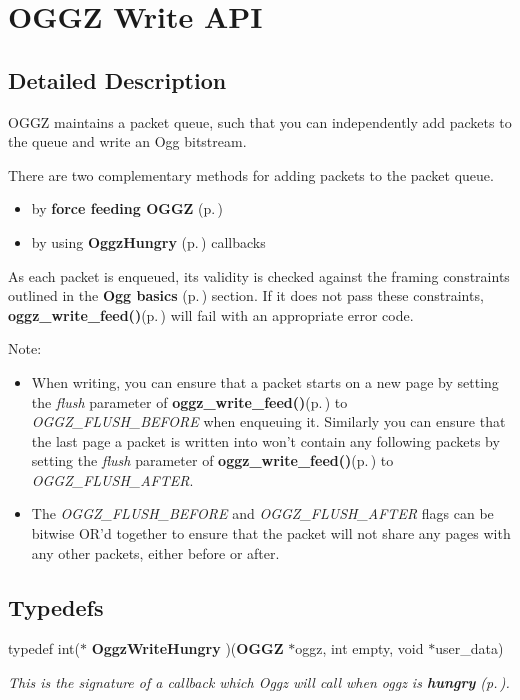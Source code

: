 \section{OGGZ Write API}
\label{group__write__api}


\subsection{Detailed Description}
OGGZ maintains a packet queue, such that you can independently add packets to the queue and write an Ogg bitstream. 

There are two complementary methods for adding packets to the packet queue.

\begin{itemize}
\item by {\bf force feeding OGGZ }{\rm (p.\,\pageref{group__force__feed})}\item by using {\bf Oggz\-Hungry }{\rm (p.\,\pageref{group__hungry})} callbacks\end{itemize}


As each packet is enqueued, its validity is checked against the framing constraints outlined in the {\bf Ogg basics }{\rm (p.\,\pageref{group__basics})} section. If it does not pass these constraints, {\bf oggz\_\-write\_\-feed()}{\rm (p.\,\pageref{group__write__api_ga2})} will fail with an appropriate error code.

\begin{Desc}
\item[Note:]\begin{itemize}
\item When writing, you can ensure that a packet starts on a new page by setting the {\em flush\/} parameter of {\bf oggz\_\-write\_\-feed()}{\rm (p.\,\pageref{group__write__api_ga2})} to {\em OGGZ\_\-FLUSH\_\-BEFORE\/} when enqueuing it. Similarly you can ensure that the last page a packet is written into won't contain any following packets by setting the {\em flush\/} parameter of {\bf oggz\_\-write\_\-feed()}{\rm (p.\,\pageref{group__write__api_ga2})} to {\em OGGZ\_\-FLUSH\_\-AFTER\/}.\item The {\em OGGZ\_\-FLUSH\_\-BEFORE\/} and {\em OGGZ\_\-FLUSH\_\-AFTER\/} flags can be bitwise OR'd together to ensure that the packet will not share any pages with any other packets, either before or after. \end{itemize}
\end{Desc}


\subsection*{Typedefs}
\begin{CompactItemize}
\item 
typedef int($\ast$ {\bf Oggz\-Write\-Hungry} )({\bf OGGZ} $\ast$oggz, int empty, void $\ast$user\_\-data)
\begin{CompactList}\small\item\em This is the signature of a callback which Oggz will call when {\em oggz\/} is {\bf hungry }{\rm (p.\,\pageref{group__hungry})}. \item\end{CompactList}\end{CompactItemize}

